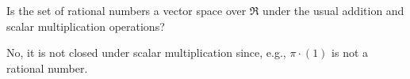
\begin{Exercise}[
name={},
title={}, 
difficulty=0,
origin={\cite{JH}}]
Is the set of rational numbers a vector space over \( \Re \) under the usual addition and scalar multiplication operations?

\end{Exercise}

\begin{Answer}
No, it is not closed under scalar multiplication since, e.g.,
       \( \pi\cdot (1) \) is not a rational number.
\end{Answer}
